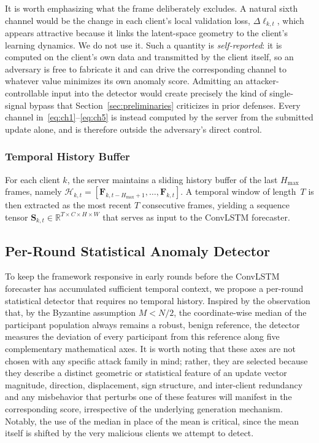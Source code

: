 \documentclass[journal]{IEEEtran}
\begin{document}
It is worth emphasizing what the frame deliberately excludes. A natural sixth channel would be the change in each client's local validation loss, $\Delta\ell_{k,t}$, which appears attractive because it links the latent-space geometry to the client's learning dynamics. We do not use it. Such a quantity is \emph{self-reported}: it is computed on the client's own data and transmitted by the client itself, so an adversary is free to fabricate it and can drive the corresponding channel to whatever value minimizes its own anomaly score. Admitting an attacker-controllable input into the detector would create precisely the kind of single-signal bypass that Section~\ref{sec:preliminaries} criticizes in prior defenses. Every channel in~\eqref{eq:ch1}--\eqref{eq:ch5} is instead computed by the server from the submitted update alone, and is therefore outside the adversary's direct control.

\subsubsection{Temporal History Buffer}
For each client $k$, the server maintains a sliding history buffer of the last $H_{\max}$ frames, namely $\mathcal{H}_{k,t} = [\mathbf{F}_{k,t-H_{\max}+1}, \ldots, \mathbf{F}_{k,t}]$. A temporal window of length~$T$ is then extracted as the most recent $T$ consecutive frames, yielding a sequence tensor $\mathbf{S}_{k,t} \in \mathbb{R}^{T \times C \times H \times W}$ that serves as input to the ConvLSTM forecaster.

\subsection{Per-Round Statistical Anomaly Detector}
\label{sec:stat_detector}

To keep the framework responsive in early rounds before the ConvLSTM forecaster has accumulated sufficient temporal context, we propose a per-round statistical detector that requires no temporal history. Inspired by the observation that, by the Byzantine assumption $M < N/2$, the coordinate-wise median of the participant population always remains a robust, benign reference, the detector measures the deviation of every participant from this reference along five complementary mathematical axes. It is worth noting that these axes are not chosen with any specific attack family in mind; rather, they are selected because they describe a distinct geometric or statistical feature of an update vector magnitude, direction, displacement, sign structure, and inter-client redundancy and any misbehavior that perturbs one of these features will manifest in the corresponding score, irrespective of the underlying generation mechanism. Notably, the use of the median in place of the mean is critical, since the mean itself is shifted by the very malicious clients we attempt to detect.
\end{document}
